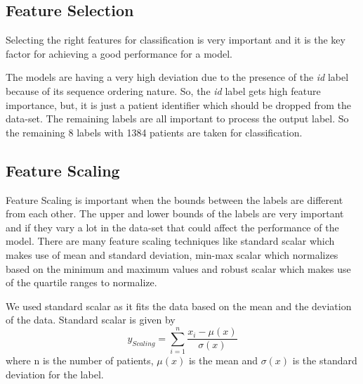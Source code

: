 \documentclass[conference]{IEEEtran}
\begin{document}
\subsection{Feature Selection}
\label{ssec:featureselect}
Selecting the right features for classification is very important and it  is the key factor for achieving a good performance for a model.
\par
The models are having a very high deviation due to the presence of the \textit{id} label because of its sequence ordering nature. So, the \textit{id} label gets high feature importance, but, it is just a patient identifier which should be dropped from the data-set. The remaining labels are all important to process the output label. So the remaining 8 labels with 1384 patients are taken for classification.
\subsection{Feature Scaling}
\label{ssec:featurescale}
Feature Scaling is important when the bounds between the labels are different from each other. The upper and lower bounds of the labels are very important and if they vary a lot in the data-set that could affect the performance of the model. There are many feature scaling techniques like standard scalar which makes use of mean and standard deviation, min-max scalar which normalizes based on the minimum and maximum values and robust scalar which makes use of the quartile ranges to normalize.
\par
We used standard scalar as it fits the data based on the mean and the deviation of the data. Standard scalar is given by
\begin{equation}
 y_{Scaling} = \sum\limits_{i=1}^{n}\frac{x_i - \mu(x) }{\sigma(x)}
\end{equation}
where n is the number of patients, $\mu(x)$ is the mean and
$\sigma(x)$ is the standard deviation for the label.
\end{document}
